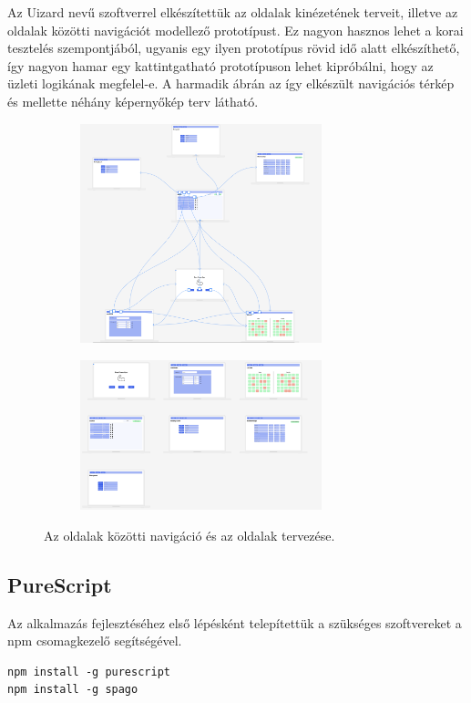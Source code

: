 \documentclass[12pt]{article}
\begin{document}
Az Uizard\cite{uizard} nevű szoftverrel elkészítettük az oldalak kinézetének terveit, illetve az oldalak közötti navigációt modellező prototípust. Ez nagyon hasznos lehet a korai tesztelés szempontjából, ugyanis egy ilyen prototípus rövid idő alatt elkészíthető, így nagyon hamar egy kattintgatható prototípuson lehet kipróbálni, hogy az üzleti logikának megfelel-e. A harmadik ábrán az így elkészült navigációs térkép és mellette néhány képernyőkép terv látható.
\begin{figure}[h!]
\centering
\begin{subfigure}{0.45\textwidth}
\includegraphics[width=7cm]{navigation} 
\end{subfigure}
\begin{subfigure}{0.4\textwidth}
\includegraphics[width=7cm]{pages}
\end{subfigure}
\caption{Az oldalak közötti navigáció és az oldalak tervezése.}
\end{figure}

\newpage
\subsection{PureScript}

Az alkalmazás fejlesztéséhez első lépésként telepítettük a szükséges szoftvereket a npm csomagkezelő segítségével. 
\begin{verbatim}
npm install -g purescript
npm install -g spago
\end{verbatim}
\end{document}
